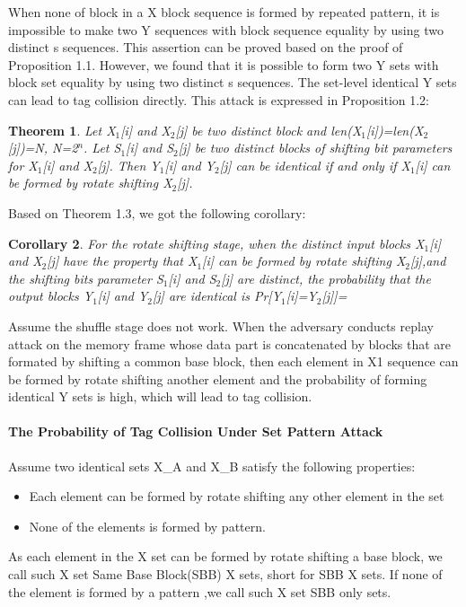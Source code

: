 \documentclass{article}
\newtheorem{theorem}{Theorem}[section]
\newtheorem{corollary}[theorem]{Corollary}
\begin{document}
When none of block in a X block sequence is formed by repeated pattern, it is impossible to make two Y sequences with block sequence equality by using two distinct s sequences. This assertion can be proved based on the proof of Proposition 1.1. However, we found that it is possible to form two Y sets with block set equality by using two distinct s sequences. The set-level identical Y sets can lead to tag collision directly. This attack is expressed in Proposition 1.2:
\begin{theorem}
Let X$_1$[i] and X$_2$[j] be two distinct block and len(X$_1$[i])=len(X$_2$[j])=N, N=2$^n$. Let S$_1$[i] and S$_2$[j] be two distinct blocks of shifting bit parameters for X$_1$[i] and X$_2$[j].
Then Y$_1$[i] and Y$_2$[j] can be identical if and only if X$_1$[i] can be formed by rotate shifting X$_2$[j].
\label{set-pattern}
\end{theorem}
Based on Theorem 1.3, we got the following corollary:
\begin{corollary}
For the rotate shifting stage, when the distinct input blocks X$_1$[i] and X$_2$[j] have the property that X$_1$[i] can be formed by rotate shifting X$_2$[j],and the shifting bits parameter S$_1$[i] and S$_2$[j] are distinct, the probability that the output blocks Y$_1$[i] and Y$_2$[j] are identical is Pr[Y$_1$[i]=Y$_2$[j]]=
\end{corollary}
Assume the shuffle stage does not work. When the adversary conducts replay attack on the memory frame whose data part is concatenated by blocks that are formated by shifting a common base block, then each element in X1 sequence can be formed by rotate shifting another element and the probability of forming identical Y sets is high, which will lead to tag collision.

\paragraph{The Probability of Tag Collision Under Set Pattern Attack}
Assume two identical sets X\_A and X\_B satisfy the following properties:
\begin{itemize}
	\item Each element can be formed by rotate shifting any other element in the set
	\item None of the elements is formed by pattern.
\end{itemize}
As each element in the X set can be formed by rotate shifting a base block, we call such X set Same Base Block(SBB) X sets, short for SBB X sets. If none of the element is formed by a pattern ,we call such X set SBB only sets.
\end{document}
